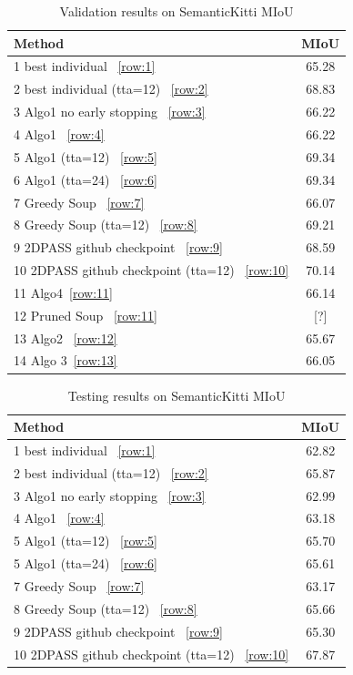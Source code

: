 \documentclass[10pt,twocolumn,letterpaper]{article}
\begin{document}
\begin{table}[!htb]
\centering
\caption{Validation results on SemanticKitti MIoU}
\label{tab:validation_results}
\begin{tabular}{|l|c|}
\hline
\textbf{Method} & \textbf{MIoU} \\
\hline
1 best individual ~\ref{row:1} & 65.28 \\
\hline
2 best individual (tta=12) ~\ref{row:2} &  68.83 \\
\hline
3 Algo1 no early stopping ~\ref{row:3} & 66.22 \\
\hline
4 Algo1 ~\ref{row:4}& 66.22 \\
\hline
5 Algo1 (tta=12) ~\ref{row:5} & 69.34 \\
\hline
6 Algo1 (tta=24) ~\ref{row:6} & 69.34 \\
\hline
7 Greedy Soup ~\ref{row:7}  & 66.07 \\
\hline
8 Greedy Soup (tta=12) ~\ref{row:8} &  69.21 \\
\hline
9 2DPASS github checkpoint ~\ref{row:9} & 68.59 \\
\hline
10 2DPASS  github checkpoint (tta=12) ~\ref{row:10} & 70.14 \\
\hline
11 Algo4~\ref{row:11} & 66.14 \\
\hline
12 Pruned Soup ~\ref{row:11} & [?] \\
\hline
13 Algo2 ~\ref{row:12} & 65.67 \\
\hline
14 Algo 3~\ref{row:13} & 66.05 \\
\hline
\end{tabular}
\end{table}
\begin{table}[!htb]
\centering
\caption{Testing results on SemanticKitti MIoU}
\label{tab:testing_results}
\begin{tabular}{|l|c|}
\hline
\textbf{Method} & \textbf{MIoU} \\
\hline
1 best individual ~\ref{row:1} &  62.82 \\
\hline
2 best individual (tta=12) ~\ref{row:2} &  65.87 \\
\hline
3 Algo1 no early stopping  ~\ref{row:3} & 62.99 \\
\hline
4 Algo1  ~\ref{row:4}& 63.18 \\
\hline
5 Algo1 (tta=12) ~\ref{row:5} & 65.70 \\
\hline
5 Algo1 (tta=24)  ~\ref{row:6} & 65.61 \\
\hline
7 Greedy Soup ~\ref{row:7}  & 63.17 \\
\hline
8 Greedy Soup (tta=12) ~\ref{row:8} &  65.66 \\
\hline
9 2DPASS github checkpoint ~\ref{row:9} & 65.30 \\
\hline
10 2DPASS  github checkpoint (tta=12) ~\ref{row:10} & 67.87 \\
\hline
\end{tabular}
\end{table}
\end{document}
